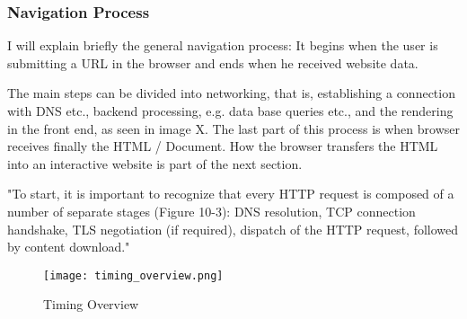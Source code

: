 







\subsubsection{Navigation Process}

I will explain briefly the general navigation process: It begins when the user is submitting a URL in the browser and ends when he received website data.

The main steps can be divided into networking, that is, establishing a connection with DNS etc., backend processing, e.g. data base queries etc., and the rendering in the front end, as seen in image X.
The last part of this process is when browser receives finally the HTML / Document. 
How the browser transfers the HTML into an interactive website is part of the next section.


"To start, it is important to recognize that every HTTP request is composed of a number of separate stages (Figure 10-3): DNS resolution, TCP connection handshake, TLS negotiation (if required), dispatch of the HTTP request, followed by content download." %



\begin{figure}[h!]
\begin{center}
\texttt{[image: timing\_overview.png]}
\caption{Timing Overview}
\label{img:timing_overview}
\end{center}
\end{figure}






